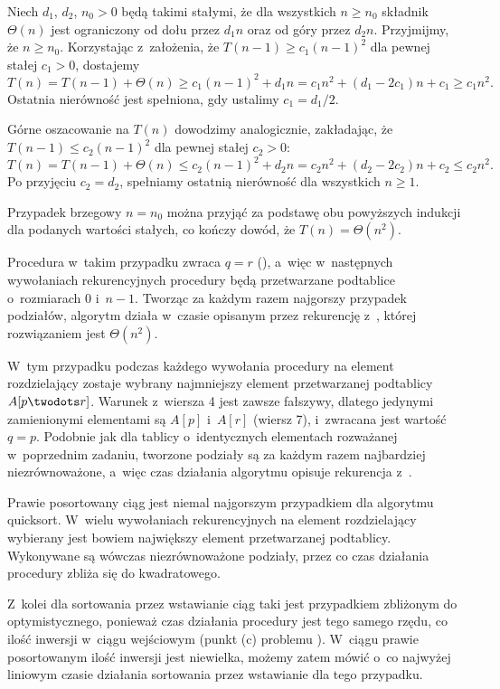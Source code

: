 
\exercise %
Niech $d_1$, $d_2$, $n_0>0$ będą takimi stałymi, że dla wszystkich $n\ge n_0$ składnik $\Theta(n)$ jest ograniczony od dołu przez $d_1n$ oraz od góry przez $d_2n$.
Przyjmijmy, że $n\ge n_0$.
Korzystając z~założenia, że $T(n-1)\ge c_1(n-1)^2$ dla pewnej stałej $c_1>0$, dostajemy
\[
	T(n) = T(n-1)+\Theta(n) \ge c_1(n-1)^2+d_1n = c_1n^2+(d_1-2c_1)n+c_1 \ge c_1n^2.
\]
Ostatnia nierówność jest spełniona, gdy ustalimy $c_1=d_1/2$.

Górne oszacowanie na $T(n)$ dowodzimy analogicznie, zakładając, że $T(n-1)\le c_2(n-1)^2$ dla pewnej stałej $c_2>0$:
\[
	T(n) = T(n-1)+\Theta(n) \le c_2(n-1)^2+d_2n = c_2n^2+(d_2-2c_2)n+c_2 \le c_2n^2.
\]
Po przyjęciu $c_2=d_2$, spełniamy ostatnią nierówność dla wszystkich $n\ge1$.

Przypadek brzegowy $n=n_0$ można przyjąć za podstawę obu powyższych indukcji dla podanych wartości stałych, co kończy dowód, że $T(n)=\Theta(n^2)$.

\exercise %
Procedura  w~takim przypadku zwraca $q=r$ (), a~więc w~następnych wywołaniach rekurencyjnych procedury  będą przetwarzane podtablice o~rozmiarach 0 i~$n-1$.
Tworząc za każdym razem najgorszy przypadek podziałów, algorytm działa w~czasie opisanym przez rekurencję z~, której rozwiązaniem jest $\Theta(n^2)$.

\exercise %
W~tym przypadku podczas każdego wywołania procedury  na element rozdzielający zostaje wybrany najmniejszy element przetwarzanej podtablicy $A[p\twodots r]$.
Warunek z~wiersza 4 jest zawsze fałszywy, dlatego jedynymi zamienionymi elementami są $A[p]$ i~$A[r]$ (wiersz 7), i~zwracana jest wartość $q=p$.
Podobnie jak dla tablicy o~identycznych elementach rozważanej w~poprzednim zadaniu, tworzone podziały są za każdym razem najbardziej niezrównoważone, a~więc czas działania algorytmu opisuje rekurencja z~.

\exercise %
Prawie posortowany ciąg jest niemal najgorszym przypadkiem dla algorytmu quicksort.
W~wielu wywołaniach rekurencyjnych na element rozdzielający wybierany jest bowiem największy element przetwarzanej podtablicy.
Wykonywane są wówczas niezrównoważone podziały, przez co czas działania procedury  zbliża się do kwadratowego.

Z~kolei dla sortowania przez wstawianie ciąg taki jest przypadkiem zbliżonym do optymistycznego, ponieważ czas działania procedury  jest tego samego rzędu, co ilość inwersji w~ciągu wejściowym (punkt (c) problemu ).
W~ciągu prawie posortowanym ilość inwersji jest niewielka, możemy zatem mówić o~co najwyżej liniowym czasie działania sortowania przez wstawianie dla tego przypadku.

